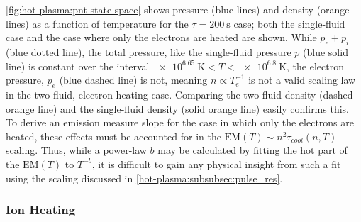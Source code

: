 \autoref{fig:hot-plasma:pnt-state-space} shows pressure (blue lines) and density (orange lines) as a function of temperature for the $\tau=\SI{200}{\second}$ case; both the single-fluid case and the case where only the electrons are heated are shown. While $p_e+p_i$ (blue dotted line), the total pressure, like the single-fluid pressure $p$ (blue solid line) is constant over the interval $\SI{e6.65}{\kelvin}<T<\SI{e6.8}{\kelvin}$, the electron pressure, $p_e$ (blue dashed line) is not, meaning $n\propto T_e^{-1}$ is not a valid scaling law in the two-fluid, electron-heating case. Comparing the two-fluid density (dashed orange line) and the single-fluid density (solid orange line) easily confirms this. To derive an emission measure slope for the case in which only the electrons are heated, these effects must be accounted for in the $\mathrm{EM}(T)\sim n^2\tau_{cool}(n,T)$ scaling. Thus, while a power-law $b$ may be calculated by fitting the hot part of the $\mathrm{EM}(T)$ to $T^{-b}$, it is difficult to gain any physical insight from such a fit using the scaling discussed in \autoref{hot-plasma:subsubsec:pulse_res}.

\subsubsection{Ion Heating}\label{hot-plasma:subsubsec:ion_heating}

